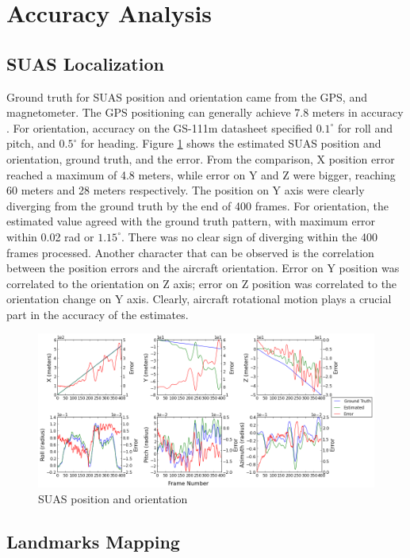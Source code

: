 \section{Accuracy Analysis}\label{sec:flight-accuracy}
\subsection{SUAS Localization}

Ground truth for SUAS position and orientation came from the GPS, and
magnetometer. The GPS positioning can generally achieve 7.8 meters in
accuracy \cite{_gps_????}. For orientation, accuracy on the GS-111m
datasheet specified $0.1^{\circ}$ for roll and pitch, and
$0.5^{\circ}$ for heading. Figure \ref{fltfig:6} shows the estimated
SUAS position and orientation, ground truth, and the error. From
the comparison, X position error reached a maximum of 4.8 meters,
while error on Y and Z were bigger, reaching 60 meters and 28 meters
respectively. The position on Y axis were clearly diverging from the
ground truth by the end of 400 frames. For orientation, the estimated
value agreed with the ground truth pattern, with maximum error within
0.02 rad or $1.15^{\circ}$. There was no clear sign of diverging
within the 400 frames processed. Another character that can be
observed is the correlation between the position errors and the
aircraft orientation. Error on Y position was correlated to the
orientation on Z axis; error on Z position was correlated to the
orientation change on Y axis. Clearly, aircraft rotational motion
plays a crucial part in the accuracy of the estimates.

\begin{figure}[h]
\centering
\includegraphics[width=15.5cm, keepaspectratio=true]
{./Figures/fltfig/cut1/Figure30.png}
\caption{SUAS position and orientation}
\label{fltfig:6}
\end{figure}
\FloatBarrier

\subsection{Landmarks Mapping}\label{sec:accuracy_features}

